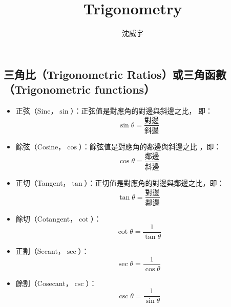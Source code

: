 \documentclass[a4paper,12pt]{report}
\begin{document}
\title{Trigonometry}
\author{沈威宇}
\date{\temtoday}
\titletocdoc
{}
\subsection{三角比（Trigonometric Ratios）或三角函數（Trigonometric functions）}
\begin{itemize}
  \item 正弦（Sine，$\sin$）：正弦值是對應角的對邊與斜邊之比， 即：\[\sin \theta = \frac{\text{對邊}}{\text{斜邊}}\]
  \item 餘弦（Cosine，$\cos$）：餘弦值是對應角的鄰邊與斜邊之比 ，即：\[\cos \theta = \frac{\text{鄰邊}}{\text{斜邊}}\]
  \item 正切（Tangent，$\tan$）：正切值是對應角的對邊與鄰邊之比，即：\[\tan \theta = \frac{\text{對邊}}{\text{鄰邊}}\]
  \item 餘切（Cotangent，$\cot$）：\[\cot \theta = \frac{1}{\tan \theta}\]
  \item 正割（Secant，$\sec$）：\[\sec \theta = \frac{1}{\cos \theta}\]
  \item 餘割（Cosecant，$\csc$）：\[\csc \theta = \frac{1}{\sin \theta}\]
\end{itemize}
\end{document}
